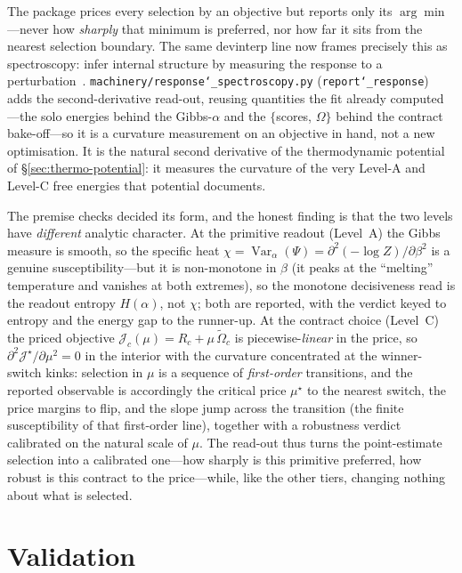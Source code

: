 \documentclass[11pt]{article}
\newcommand{\allowbreakhere}{\discretionary{}{}{}}
\newcommand{\code}[1]{\texttt{\def\_{\char`_\allowbreakhere}#1}}
\begin{document}
The package prices every selection by an objective but reports only its $\arg\min$---never how
\emph{sharply} that minimum is preferred, nor how far it sits from the nearest selection boundary. The
same devinterp line now frames precisely this as spectroscopy: infer internal structure by measuring the
response to a perturbation~\cite{gordon2026spectro}. \code{machinery/response\_spectroscopy.py}
(\code{report\_response}) adds the second-derivative read-out, reusing quantities the fit already
computed---the solo energies behind the Gibbs-$\alpha$ and the $\{$scores, $\Omega\}$ behind the contract
bake-off---so it is a curvature measurement on an objective in hand, not a new optimisation. It is the
natural second derivative of the thermodynamic potential of \S\ref{sec:thermo-potential}: it measures the
curvature of the very Level-A and Level-C free energies that potential documents.

The premise checks decided its form, and the honest finding is that the two levels have \emph{different}
analytic character. At the primitive readout (Level~A) the Gibbs measure is smooth, so the specific heat
$\chi=\operatorname{Var}_\alpha(\Psi)=\partial^2(-\log Z)/\partial\beta^2$ is a genuine susceptibility---but
it is non-monotone in $\beta$ (it peaks at the ``melting'' temperature and vanishes at both extremes), so
the monotone decisiveness read is the readout entropy $H(\alpha)$, not $\chi$; both are reported, with the
verdict keyed to entropy and the energy gap to the runner-up. At the contract choice (Level~C) the priced
objective $\mathcal J_c(\mu)=R_c+\mu\,\tilde\Omega_c$ is piecewise-\emph{linear} in the price, so
$\partial^2\mathcal J^\star/\partial\mu^2=0$ in the interior with the curvature concentrated at the
winner-switch kinks: selection in $\mu$ is a sequence of \emph{first-order} transitions, and the reported
observable is accordingly the critical price $\mu^\star$ to the nearest switch, the price margins to flip,
and the slope jump across the transition (the finite susceptibility of that first-order line), together
with a robustness verdict calibrated on the natural scale of $\mu$. The read-out thus turns the
point-estimate selection into a calibrated one---how sharply is this primitive preferred, how robust is
this contract to the price---while, like the other tiers, changing nothing about what is selected.


\section{Validation}
\label{sec:validation}
\end{document}
